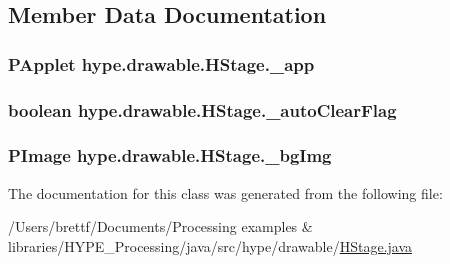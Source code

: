 \subsection{Member Data Documentation}
\hypertarget{classhype_1_1drawable_1_1_h_stage_acc8f556b5932d9ec0517827624f0a78a}{
\subsubsection[{\-\_\-app}]{\setlength{\rightskip}{0pt plus 5cm}P\-Applet hype.\-drawable.\-H\-Stage.\-\_\-app\hspace{0.3cm}{\ttfamily [protected]}}}\label{classhype_1_1drawable_1_1_h_stage_acc8f556b5932d9ec0517827624f0a78a}
\hypertarget{classhype_1_1drawable_1_1_h_stage_a897a86463a443c95adaa9adbaca8b449}{
\subsubsection[{\-\_\-auto\-Clear\-Flag}]{\setlength{\rightskip}{0pt plus 5cm}boolean hype.\-drawable.\-H\-Stage.\-\_\-auto\-Clear\-Flag\hspace{0.3cm}{\ttfamily [protected]}}}\label{classhype_1_1drawable_1_1_h_stage_a897a86463a443c95adaa9adbaca8b449}
\hypertarget{classhype_1_1drawable_1_1_h_stage_a889be7b38d96ba3d74b714161a96146c}{
\subsubsection[{\-\_\-bg\-Img}]{\setlength{\rightskip}{0pt plus 5cm}P\-Image hype.\-drawable.\-H\-Stage.\-\_\-bg\-Img\hspace{0.3cm}{\ttfamily [protected]}}}\label{classhype_1_1drawable_1_1_h_stage_a889be7b38d96ba3d74b714161a96146c}


The documentation for this class was generated from the following file\-:\begin{DoxyCompactItemize}
\item 
/\-Users/brettf/\-Documents/\-Processing examples \& libraries/\-H\-Y\-P\-E\-\_\-\-Processing/java/src/hype/drawable/\hyperlink{_h_stage_8java}{H\-Stage.\-java}\end{DoxyCompactItemize}
